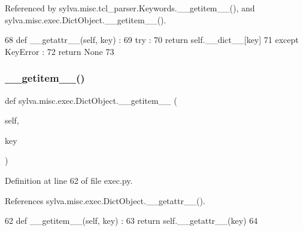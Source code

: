 Referenced by sylva.\+misc.\+tcl\+\_\+parser.\+Keywords.\+\_\+\+\_\+getitem\+\_\+\+\_\+(), and sylva.\+misc.\+exec.\+Dict\+Object.\+\_\+\+\_\+getitem\+\_\+\+\_\+().


\begin{DoxyCode}
68   \textcolor{keyword}{def }\_\_getattr\_\_(self, key) :
69     \textcolor{keywordflow}{try} :
70       \textcolor{keywordflow}{return} self.\_\_dict\_\_[key]
71     \textcolor{keywordflow}{except} KeyError :
72       \textcolor{keywordflow}{return} \textcolor{keywordtype}{None}
73 
\end{DoxyCode}
\mbox{\label{classsylva_1_1misc_1_1exec_1_1_dict_object_ab360685e86a5d323b99adcde29546ebb}} 
\subsubsection{\texorpdfstring{\+\_\+\+\_\+getitem\+\_\+\+\_\+()}{\_\_getitem\_\_()}}
{\footnotesize\ttfamily def sylva.\+misc.\+exec.\+Dict\+Object.\+\_\+\+\_\+getitem\+\_\+\+\_\+ (\begin{DoxyParamCaption}\item[{}]{self,  }\item[{}]{key }\end{DoxyParamCaption})\hspace{0.3cm}{\ttfamily [inherited]}}



Definition at line 62 of file exec.\+py.



References sylva.\+misc.\+exec.\+Dict\+Object.\+\_\+\+\_\+getattr\+\_\+\+\_\+().


\begin{DoxyCode}
62   \textcolor{keyword}{def }\_\_getitem\_\_(self, key) :
63     \textcolor{keywordflow}{return} self.\_\_getattr\_\_(key)
64 
\end{DoxyCode}
\mbox{\label{classsylva_1_1misc_1_1exec_1_1_dict_object_a50fd48db155e090c3fb26a50e2999a95}} 
